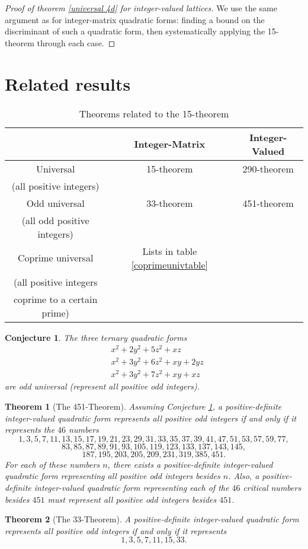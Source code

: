 \documentclass{article}
\newtheorem{thm}{Theorem}
\newtheorem{conj}{Conjecture}
\begin{document}
\begin{proof}[Proof of theorem \ref{universal 4d} for integer-valued lattices]
    We use the same argument as for integer-matrix quadratic forms: finding a bound on the discriminant of such a quadratic form, then systematically applying the 15-theorem through each case.
\end{proof}

\section{Related results}

\begin{table}[H]
    \begin{tabular}{|c|c|c|}
        \hline
        & Integer-Matrix & Integer-Valued \\ \hline
        Universal & 15-theorem & 290-theorem \\
        (all positive integers) && \\ \hline
        Odd universal & 33-theorem & 451-theorem \\
        (all odd positive integers) && \\ \hline
        Coprime universal & Lists in table \ref{coprimeunivtable} & \\
        (all positive integers && \\
        coprime to a certain prime) && \\ \hline
    \end{tabular}
    \caption{Theorems related to the 15-theorem}
\end{table}
\begin{conj}\label{451thmconj}
    The three ternary quadratic forms
    \begin{align*}
        & x^2 + 2y^2 + 5z^2 + xz \\
        & x^2 + 3y^2 + 6z^2 + xy + 2yz \\
        & x^2 + 3y^2 + 7z^2 + xy + xz
    \end{align*}
    are odd universal (represent all positive odd integers).
\end{conj}
\begin{thm}[The 451-Theorem]
    Assuming Conjecture \ref{451thmconj}, a positive-definite integer-valued quadratic form represents all positive \emph{odd} integers if and only if it represents the $46$ numbers
    \[1, 3, 5, 7, 11, 13, 15, 17, 19, 21, 23, 29, 31, 33, 35, 37, 39, 41, 47, 51, 53, 57, 59, 77,\]
    \[83, 85, 87, 89, 91, 93, 105, 119, 123, 133, 137, 143, 145,\]
    \[187, 195, 203, 205, 209, 231, 319, 385, 451.\]
    For each of these numbers $n$, there exists a positive-definite integer-valued quadratic form representing all positive odd integers besides $n$. Also, a positive-definite integer-valued quadratic form representing each of the $46$ critical numbers besides $451$ must represent all positive odd integers besides $451$.
\end{thm}
\begin{thm}[The 33-Theorem]
    A positive-definite integer-valued quadratic form represents all positive odd integers if and only if it represents
    \[1, 3, 5, 7, 11, 15, 33.\]
\end{thm}
\end{document}
